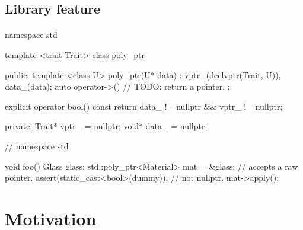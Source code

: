 \documentclass{article}
\begin{document}
\subsection{Library feature}
\paragraph{}
\begin{codeblock}
namespace std {
template <trait Trait>
class poly_ptr {
 public:
  template <class U>
  poly_ptr(U* data)
    : vptr_(declvptr(Trait, U)), data_(data);
  auto operator->() {
    // TODO: return a pointer.
  };

  explicit operator bool() const {
    return data_ != nullptr &&
           vptr_ != nullptr;
  }

 private:
  Trait* vptr_ = nullptr;
  void* data_ = nullptr;
}
} // namespace std

void foo() {
  Glass glass;
  std::poly_ptr<Material> mat = &glass; // accepts a raw pointer.
  assert(static_cast<bool>(dummy)); // not nullptr.
  mat->apply();
}
\end{codeblock}

\section{Motivation}
\end{document}
